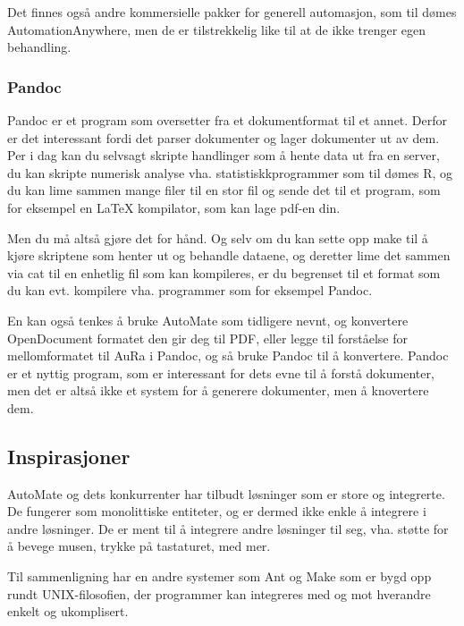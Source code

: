 \documentclass[11pt]{article}
\begin{document}
Det finnes også andre kommersielle pakker for generell automasjon, som til dømes AutomationAnywhere, men de er tilstrekkelig like til at de ikke trenger egen behandling.



\subsubsection{Pandoc}



Pandoc er et program som oversetter fra et dokumentformat til et annet. Derfor er det interessant fordi det parser dokumenter og lager dokumenter ut av dem.
Per i dag kan du selvsagt skripte handlinger som å hente data ut fra en server, du kan skripte numerisk analyse vha. statistiskkprogrammer som til dømes R, og du kan lime sammen mange filer til en stor fil og sende det til et program, som for eksempel en LaTeX kompilator, som kan lage pdf-en din.



Men du må altså gjøre det for hånd. Og selv om du kan sette opp make til å kjøre skriptene som henter ut og behandle dataene, og deretter lime det sammen via cat til en enhetlig fil som kan kompileres, er du begrenset til et format som du kan evt. kompilere vha. programmer som for eksempel Pandoc.



En kan også tenkes å bruke AutoMate som tidligere nevnt, og konvertere OpenDocument formatet den gir deg til PDF, eller legge til forståelse for mellomformatet til AuRa i Pandoc, og så bruke Pandoc til å konvertere. Pandoc er et nyttig program, som er interessant for dets evne til å forstå dokumenter, men det er altså ikke et system for å generere dokumenter, men å knovertere dem.



\subsection{Inspirasjoner}



AutoMate og dets konkurrenter har tilbudt løsninger som er store og integrerte. De fungerer som monolittiske entiteter, og er dermed ikke enkle å integrere i andre løsninger. De er ment til å integrere andre løsninger til seg, vha. støtte for å bevege musen, trykke på tastaturet, med mer.



Til sammenligning har en andre systemer som Ant og Make som er bygd opp rundt UNIX-filosofien\cite{taop}, der programmer kan integreres med og mot hverandre enkelt og ukomplisert.
\end{document}
